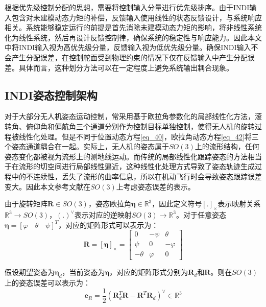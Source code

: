 根据优先级控制分配的思想，需要将控制输入分量进行优先级排序。由于INDI输入包含对未建模动态力矩的补偿，反馈输入使用线性的状态反馈设计，与系统响应相关。系统能够稳定运行的前提是首先消除未建模动态力矩的影响，将非线性系统化为线性系统，然后再设计反馈控制律，确保系统的稳定性与响应能力。因此本文中将INDI输入视为高优先级分量，反馈输入视为低优先级分量。确保INDI输入不会产生分配误差，在控制舵面受到物理约束的情况下仅在反馈输入中产生分配误差。具体而言，这种划分方法可以在一定程度上避免系统输出耦合现象\cite{HKXB202010026}。

\subsection{INDI姿态控制架构}

对于大部分无人机姿态运动控制，常采用基于欧拉角参数化的局部线性化方法，滚转角、俯仰角和偏航角三个通道分别作为控制目标单独控制，使得无人机的旋转过程被线性化处理。但是不同于位置动态方程\eqref{eq_40}，欧拉角动态方程\eqref{eq_42}将三个姿态通道耦合在一起。实际上，无人机的姿态属于$SO(3)$上的流形结构，任何姿态变化都被视为流形上的测地线运动。而传统的局部线性化跟踪姿态的方法相当于在流形的切空间进行局部线性逼近，这种线性化处理方式导致了姿态轨迹生成过程中的不连续性，丢失了流形的曲率信息，所以在机动飞行时会导致姿态跟踪误差变大。因此本文参考文献\parencite{10.1115/1.4052714}在$SO(3)$上考虑姿态误差的表示。

由于旋转矩阵$\boldsymbol{R}\in{SO(3)}$，姿态欧拉角$\boldsymbol{\eta}\in\mathbb{R}^3$，因此定义符号$[.]_\times$表示映射关系$\mathbb{R}^3\to SO(3)$，$(.)^\vee$表示对应的逆映射$SO(3)\to\mathbb{R}^3$。对于任意姿态$\boldsymbol{\eta}=[\varphi \quad \theta \quad \psi]^T$，对应的矩阵形式可以表示为：
\begin{equation}
    \boldsymbol{R}=[\boldsymbol{\eta}]_\times=
    \begin{bmatrix}
    0 & -\psi & \theta \\
    \psi & 0 & -\varphi \\
    -\theta & \varphi & 0
    \end{bmatrix}
    \label{3-22}
\end{equation}

假设期望姿态为$\boldsymbol{\eta}_d$，当前姿态为$\boldsymbol{\eta}$，对应的矩阵形式分别为$\boldsymbol{R}_d$和$\boldsymbol{R}$。则在${SO(3)}$上的姿态误差可以表示为：
\begin{equation}
    \boldsymbol{e}_R=\dfrac{1}{2}(\boldsymbol{R}_d^T\boldsymbol{R}-\boldsymbol{R}^T\boldsymbol{R}_d)^\vee\in \mathbb{R}^3
    \label{3-23}
\end{equation}


